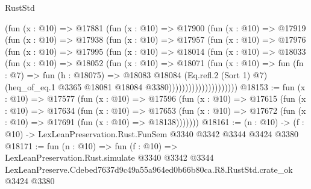 \begin{lexlean}{RustStd}
\begin{coremodule}
                    (fun (x : @10) =>
                    @17881
                      (fun (x : @10) =>
                      @17900
                        (fun (x : @10) =>
                        @17919
                          (fun (x : @10) =>
                          @17938
                            (fun (x : @10) =>
                            @17957
                              (fun (x : @10) =>
                              @17976
                                (fun (x : @10) =>
                                @17995
                                  (fun (x : @10) =>
                                  @18014
                                    (fun (x : @10) =>
                                    @18033
                                      (fun (x : @10) =>
                                      @18052
                                        (fun (x : @10) =>
                                        @18071
                                          (fun (x : @10) =>
                                          fun (fn : @7) =>
                                          fun (h : @18075) =>
                                          @18083
                                            @18084
                                            (Eq.refl.{2} (Sort 1) @7)
                                            (heq_of_eq.{1}
                                              @3365
                                              @18081
                                              @18084
                                              @3380)))))))))))))))))))))
@18153 := fun (x : @10) =>
  @17577
    (fun (x : @10) =>
    @17596
      (fun (x : @10) =>
      @17615
        (fun (x : @10) =>
        @17634
          (fun (x : @10) =>
          @17653 (fun (x : @10) => @17672 (fun (x : @10) => @17691 (fun (x : @10) => @18138)))))))
@18161 := (n : @10) -> (f : @10) -> LexLeanPreservation.Rust.FunSem @3340 @3342 @3344 @3424 @3380
@18171 := fun (n : @10) =>
  fun (f : @10) =>
  LexLeanPreservation.Rust.simulate
    @3340
    @3342
    @3344
    LexLeanPreserve.Cdebed7637d9c49a55a964ed0b66b80ca.R8.RustStd.crate_ok
    @3424
    @3380
\end{coremodule}
\end{lexlean}
